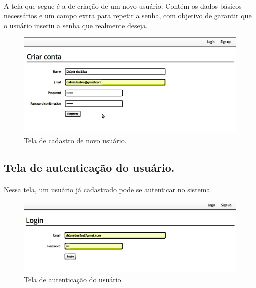 \documentclass[11pt]{article}
\begin{document}
    \paragraph{}
    A tela que segue é a de criação de um novo usuário. Contém os dados 
    básicos necessários e um campo extra para repetir a senha, com objetivo de
    garantir que o usuário inseriu a senha que realmente deseja.
    
    \begin{figure}[h!]
      \centering
      \includegraphics[width=.9\textwidth]{create_user.png}
      \caption{Tela de cadastro de novo usuário.}
    \end{figure}
    
    \subsection{Tela de autenticação do usuário.}
    
    \paragraph{}

    Nessa tela, um usuário já cadastrado pode se autenticar no sistema.
        
    \begin{figure}[h!]
      \centering
      \includegraphics[width=.9\textwidth]{authenticate_user.png}
      \caption{Tela de autenticação do usuário.}
    \end{figure}
        
  \clearpage
    
\end{document}

